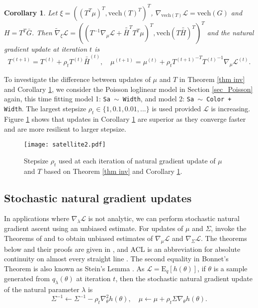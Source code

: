 \documentclass{statsoc}
\newtheorem{corollary}{Corollary}
\newcommand\E{{\text{E}}}
\newcommand\mL{{\mathcal{L}}}
\newcommand{\vech}{\text{vech}}
\newcommand{\dH}{\bar{\bar{H}}}
\begin{document}
\begin{corollary} \label{cor inv}
Let $\xi = ((T^T \mu)^T, \vech(T)^T)^T$, $\nabla_{\vech(T)} \mL = \vech(G)$ and $H = T^T \bar{G}$. Then $\widetilde{\nabla}_\xi \mL= ((T^{-1} \nabla_\mu \mL + \dH^T T^T \mu)^T, \vech(T \dH)^T)^T$ and the natural gradient update at iteration $t$ is 
\[
T^{(t+1)} = T^{(t)} + \rho_t T^{(t)}\dH^{(t)},  
\quad 
\mu^{(t+1)} = \mu^{(t)} + \rho_t {T^{(t+1)}}^{-T} {T^{(t)}}^{-1} \nabla_\mu \mL^{(t)}.
\]
\end{corollary}

To investigate the difference between updates of $\mu$ and $T$ in Theorem \ref{thm inv} and Corollary \ref{cor inv}, we consider the Poisson loglinear model in Section \ref{sec_Poisson} again, this time fitting model 1: {\tt Sa $\sim$ Width}, and model 2: {\tt Sa $\sim$  Color + Width}. The largest stepsize $\rho_t \in \{1, 0.1, 0.01, ...\}$ is used provided $\mL$ is increasing. Figure \ref{Fig b} shows that updates in Corollary \ref{cor inv} are superior as they converge faster and are more resilient to larger stepsize.

\begin{figure}[htb!]
\centering
\texttt{[image: satellite2.pdf]}
\caption{Stepsize $\rho_t$ used at each iteration of natural gradient update of $\mu$ and $T$ based on Theorem \ref{thm inv} and Corollary \ref{cor inv}.}
\label{Fig b}
\end{figure}

\subsection{Stochastic natural gradient updates}
 In applications where $\nabla_\lambda \mL$ is not analytic, we can perform stochastic natural gradient ascent using an unbiased estimate.  For updates of $\mu$ and $\Sigma$, \cite{Khan2018} invoke the Theorems of \cite{Bonnet1964} and \cite{Price1958} to obtain unbiased estimates of $\nabla_\mu \mL$ and $\nabla_{\Sigma}\mL$. The theorems below and their proofs are given in \cite{Lin2019a}, and ACL is an abbreviation for absolute continuity on almost every straight line \citep{Leoni2017}. The second equality  in Bonnet's Theorem is also known as Stein's Lemma \citep{Stein1981}. As $\mL = \E_q [h(\theta)]$, if $\theta$ is a sample generated from $q_\lambda(\theta)$ at iteration $t$, then the stochastic natural gradient update of the natural parameter $\lambda$ is   
\[
\Sigma^{-1} \leftarrow \Sigma^{-1} - \rho_t \nabla^2_\theta h(\theta), 
\quad 
\mu \leftarrow \mu + \rho_t \Sigma\nabla_{\theta} h(\theta).
\]
\end{document}
